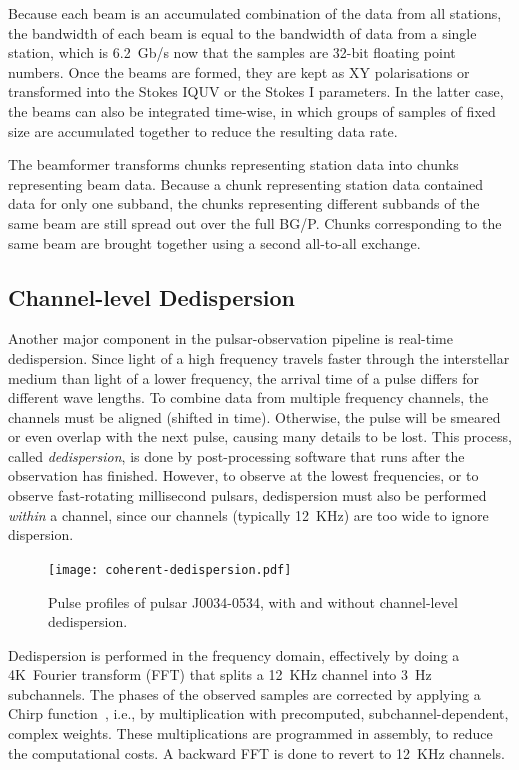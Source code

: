 \documentclass{llncs}
\begin{document}
Because each beam is an accumulated combination of the data from all stations, the bandwidth of each beam is equal to the bandwidth of data from a single station, which is 6.2~Gb/s now that the samples are 32-bit floating point numbers. Once the beams are formed, they are kept as XY polarisations or transformed into the Stokes IQUV or the Stokes I parameters. In the latter case, the beams can also be integrated time-wise, in which groups of samples of fixed size are accumulated together to reduce the resulting data rate.

The beamformer transforms chunks representing station data into chunks representing beam data. Because a chunk representing station data contained data for only one subband, the chunks representing different subbands of the same beam are still spread out over the full BG/P. Chunks corresponding to the same beam are brought together using a second all-to-all exchange.

\subsection{Channel-level Dedispersion}

Another major component in the pulsar-observation pipeline is real-time dedispersion.  Since light of a high frequency travels faster through the interstellar medium than light of a lower frequency, the arrival time of a pulse differs for different wave lengths. To combine data from multiple frequency channels, the channels must be aligned (shifted in time). Otherwise, the pulse will be smeared or even overlap with the next pulse, causing many details to be lost. This process, called \emph{dedispersion}, is done by post-processing software that runs after the observation has finished.  However, to observe at the lowest frequencies, or to observe fast-rotating millisecond pulsars, dedispersion must also be performed \emph{within\/} a channel, since our channels (typically 12~KHz) are too wide to ignore dispersion.

\begin{figure}[ht]
\texttt{[image: coherent-dedispersion.pdf]}
\label{fig:dedispersion-result}
\caption{Pulse profiles of pulsar J0034-0534, with and without channel-level dedispersion.}
\end{figure}

Dedispersion is performed in the frequency domain, effectively by doing a 4K~Fourier transform (FFT) that splits a 12~KHz channel into 3~Hz subchannels. The phases of the observed samples are corrected by applying a Chirp function~\cite{...}, i.e., by multiplication with precomputed, subchannel-dependent, complex weights. These multiplications are programmed in assembly, to reduce the computational costs. A backward FFT is done to revert to 12~KHz channels. 
\end{document}

